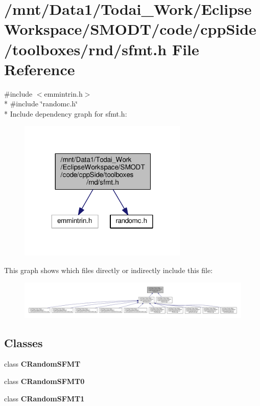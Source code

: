 \section{/mnt/\-Data1/\-Todai\-\_\-\-Work/\-Eclipse\-Workspace/\-S\-M\-O\-D\-T/code/cpp\-Side/toolboxes/rnd/sfmt.h File Reference}
\label{toolboxes_2rnd_2sfmt_8h}
{\ttfamily \#include $<$emmintrin.\-h$>$}\\*
{\ttfamily \#include \char`\"{}randomc.\-h\char`\"{}}\\*
Include dependency graph for sfmt.\-h\-:
\nopagebreak
\begin{figure}[H]
\begin{center}
\leavevmode
\includegraphics[width=228pt]{toolboxes_2rnd_2sfmt_8h__incl}
\end{center}
\end{figure}
This graph shows which files directly or indirectly include this file\-:
\nopagebreak
\begin{figure}[H]
\begin{center}
\leavevmode
\includegraphics[width=350pt]{toolboxes_2rnd_2sfmt_8h__dep__incl}
\end{center}
\end{figure}
\subsection*{Classes}
\begin{DoxyCompactItemize}
\item 
class {\bf C\-Random\-S\-F\-M\-T}
\item 
class {\bf C\-Random\-S\-F\-M\-T0}
\item 
class {\bf C\-Random\-S\-F\-M\-T1}
\end{DoxyCompactItemize}
